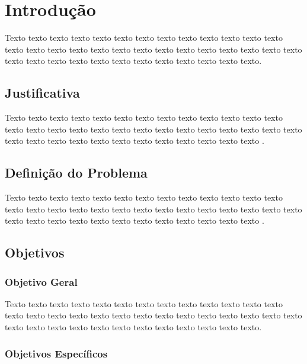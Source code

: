\chapter{Introdução}


Texto texto texto texto texto texto texto texto texto texto texto texto texto texto texto texto texto texto texto texto texto texto texto texto texto texto texto texto texto texto texto texto texto texto texto texto texto texto texto. 


\section{Justificativa}

Texto texto texto texto texto texto texto texto texto texto texto texto texto texto texto texto texto texto texto texto texto texto texto texto texto texto texto texto texto texto texto texto texto texto texto texto texto texto texto \citep{ref:Ellis2021}.

\section{Definição do Problema}

Texto texto texto texto texto texto texto texto texto texto texto texto texto texto texto texto texto texto texto texto texto texto texto texto texto texto texto texto texto texto texto texto texto texto texto texto texto texto texto \citep{ref:vazquez}.

\section{Objetivos}

\subsection{Objetivo Geral}

Texto texto texto texto texto texto texto texto texto texto texto texto texto texto texto texto texto texto texto texto texto texto texto texto texto texto texto texto texto texto texto texto texto texto texto texto texto texto texto.

\subsection{Objetivos Específicos}

